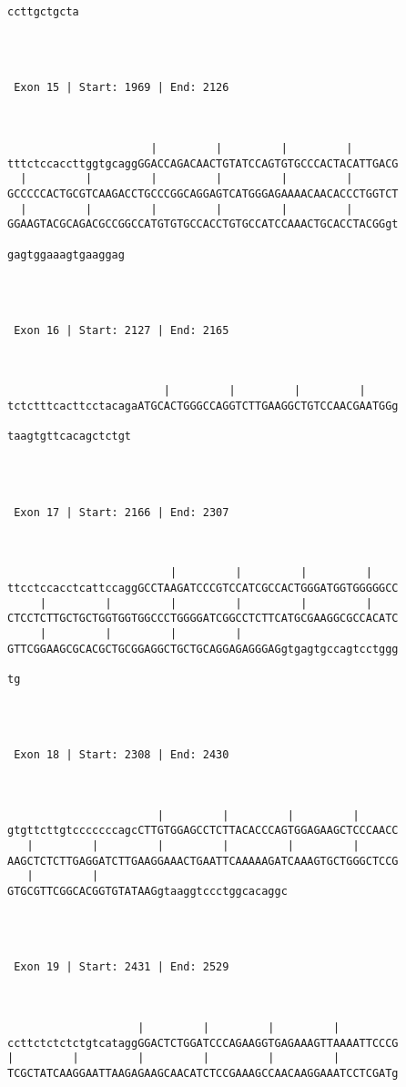 \documentclass{article}
\begin{document}
\begin{Verbatim}
ccttgctgcta




 Exon 15 | Start: 1969 | End: 2126 



                      |         |         |         |       
tttctccaccttggtgcaggGGACCAGACAACTGTATCCAGTGTGCCCACTACATTGACG
  |         |         |         |         |         |       
GCCCCCACTGCGTCAAGACCTGCCCGGCAGGAGTCATGGGAGAAAACAACACCCTGGTCT
  |         |         |         |         |         |       
GGAAGTACGCAGACGCCGGCCATGTGTGCCACCTGTGCCATCCAAACTGCACCTACGGgt
                  
gagtggaaagtgaaggag




 Exon 16 | Start: 2127 | End: 2165 



                        |         |         |         |     
tctctttcacttcctacagaATGCACTGGGCCAGGTCTTGAAGGCTGTCCAACGAATGGg
                   
taagtgttcacagctctgt




 Exon 17 | Start: 2166 | End: 2307 



                         |         |         |         |    
ttcctccacctcattccaggGCCTAAGATCCCGTCCATCGCCACTGGGATGGTGGGGGCC
     |         |         |         |         |         |    
CTCCTCTTGCTGCTGGTGGTGGCCCTGGGGATCGGCCTCTTCATGCGAAGGCGCCACATC
     |         |         |         |                        
GTTCGGAAGCGCACGCTGCGGAGGCTGCTGCAGGAGAGGGAGgtgagtgccagtcctggg
  
tg




 Exon 18 | Start: 2308 | End: 2430 



                       |         |         |         |      
gtgttcttgtcccccccagcCTTGTGGAGCCTCTTACACCCAGTGGAGAAGCTCCCAACC
   |         |         |         |         |         |      
AAGCTCTCTTGAGGATCTTGAAGGAAACTGAATTCAAAAAGATCAAAGTGCTGGGCTCCG
   |         |                             
GTGCGTTCGGCACGGTGTATAAGgtaaggtccctggcacaggc




 Exon 19 | Start: 2431 | End: 2529 



                    |         |         |         |         
ccttctctctctgtcataggGGACTCTGGATCCCAGAAGGTGAGAAAGTTAAAATTCCCG
|         |         |         |         |         |         
TCGCTATCAAGGAATTAAGAGAAGCAACATCTCCGAAAGCCAACAAGGAAATCCTCGATg
                   

\end{Verbatim}
\end{document}
